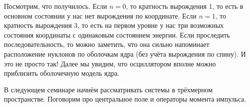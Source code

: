 Посмотрим, что получилось. Если $n = 0$, то кратность вырождения 1, то есть в
основном состоянии у нас нет вырождения по координате. Если $n = 1$, то
кратность вырождения 3, то есть на первом уровне у нас три возможных состояния
координаты с одинаковым состоянием энергии. Если проследить последовательность,
то можно заметить, что она сильно напоминает расположение нуклонов по оболочкам
ядра (без учёта вырождения по спину). И это не просто так! Далее мы увидим, что
осциллятором вполне можно приблизить оболочечную модель ядра.
\qedsq

В следующем семинаре начнём рассматривать системы в трёхмерном пространстве.
Поговорим про центральное поле и операторы момента импульса.

